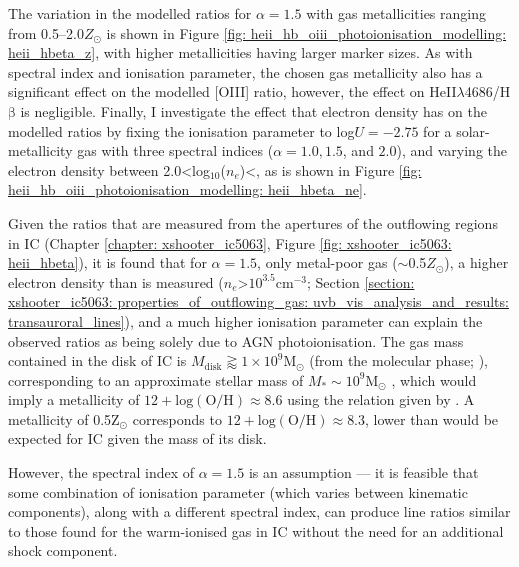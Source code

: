 The variation in the modelled ratios for $\alpha=1.5$ with gas metallicities ranging from 0.5--2.0\;$Z_\odot$ is shown in Figure \ref{fig: heii_hb_oiii_photoionisation_modelling: heii_hbeta_z}, with higher metallicities having larger marker sizes. As with spectral index and ionisation parameter, the chosen gas metallicity also has a significant effect on the modelled [OIII] ratio, however, the effect on HeII$\lambda$4686/H$\mathrm{\beta}$ is negligible. Finally, I investigate the effect that electron density has on the modelled ratios by fixing the ionisation parameter to log$U=-2.75$ for a solar-metallicity gas with three spectral indices ($\alpha=1.0, 1.5$, and $2.0$), and varying the electron density between \mbox{2.0\;\textless\;log$_\mathrm{10}$($n_e$\;[cm$^{-3}$])\;\textless{}}, as is shown in Figure \ref{fig: heii_hb_oiii_photoionisation_modelling: heii_hbeta_ne}.

Given the ratios that are measured from the apertures of the outflowing regions in IC (Chapter \ref{chapter: xshooter_ic5063}, Figure \ref{fig: xshooter_ic5063: heii_hbeta}), it is found that for $\alpha=1.5$, only metal-poor gas ($\sim$0.5\;$Z_\odot$), a higher electron density than is measured ($n_e$\;\textgreater\;$10^{3.5}$\;cm$^{-3}$; Section \ref{section: xshooter_ic5063: properties_of_outflowing_gas: uvb_vis_analysis_and_results: transauroral_lines}), and a much higher ionisation parameter can explain the observed ratios as being solely due to AGN photoionisation. The gas mass contained in the disk of IC is $M_\mathrm{disk}\gtrapprox 1 \times 10^9$\;M$_\odot$ (from the molecular phase; \citealt{Morganti2015}), corresponding to an approximate stellar mass of $M_*\sim10^9$\;M$_\odot$ \citep{Maddox2015}, which would imply a metallicity of $12+\mathrm{log(O/H)}\approx8.6$ using the relation given by \citet{Tremonti2004}. A metallicity of 0.5\;Z$_\odot$ corresponds to $12+\mathrm{log(O/H)}\approx8.3$, lower than would be expected for IC given the mass of its disk. 

However, the spectral index of $\alpha=1.5$ is an assumption --- it is feasible that some combination of ionisation parameter (which varies between kinematic components), along with a different spectral index, can produce line ratios similar to those found for the warm-ionised gas in IC without the need for an additional shock component.

